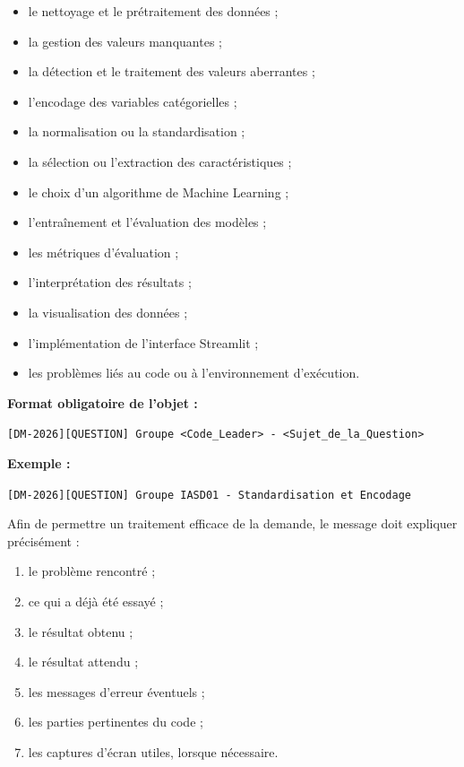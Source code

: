 \documentclass[11pt,a4paper]{article}
\begin{document}
\begin{tcolorbox}[
    colback=sintefblue!8,
    colframe=sintefblue,
    title=\textbf{DIRECTIVES OFFICIELLES DE COMMUNICATION, DE SUIVI ET DE RENDU},
    arc=2mm,
    boxrule=0.8pt,
    breakable
]
\begin{enumerate}[leftmargin=*]
    \begin{itemize}
        \item le nettoyage et le prétraitement des données ;
        \item la gestion des valeurs manquantes ;
        \item la détection et le traitement des valeurs aberrantes ;
        \item l'encodage des variables catégorielles ;
        \item la normalisation ou la standardisation ;
        \item la sélection ou l'extraction des caractéristiques ;
        \item le choix d'un algorithme de Machine Learning ;
        \item l'entraînement et l'évaluation des modèles ;
        \item les métriques d'évaluation ;
        \item l'interprétation des résultats ;
        \item la visualisation des données ;
        \item l'implémentation de l'interface Streamlit ;
        \item les problèmes liés au code ou à l'environnement d'exécution.
    \end{itemize}

    \textbf{Format obligatoire de l'objet :}

    \begin{center}
        \texttt{[DM-2026][QUESTION] Groupe <Code\_Leader> - <Sujet\_de\_la\_Question>}
    \end{center}

    \textbf{Exemple :}

    \begin{center}
        \texttt{[DM-2026][QUESTION] Groupe IASD01 - Standardisation et Encodage}
    \end{center}

    Afin de permettre un traitement efficace de la demande, le message doit
    expliquer précisément :

    \begin{enumerate}
        \item le problème rencontré ;
        \item ce qui a déjà été essayé ;
        \item le résultat obtenu ;
        \item le résultat attendu ;
        \item les messages d'erreur éventuels ;
        \item les parties pertinentes du code ;
        \item les captures d'écran utiles, lorsque nécessaire.
    \end{enumerate}


\end{enumerate}
\end{tcolorbox}
\end{document}
